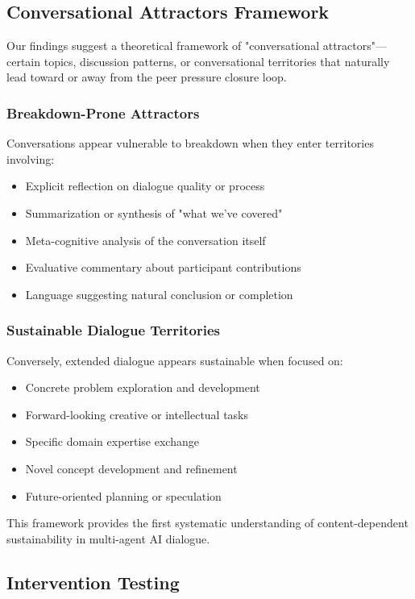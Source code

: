 \documentclass[11pt,letterpaper]{article}
\begin{document}
\subsection{Conversational Attractors Framework}

Our findings suggest a theoretical framework of "conversational attractors"—certain topics, discussion patterns, or conversational territories that naturally lead toward or away from the peer pressure closure loop.

\subsubsection{Breakdown-Prone Attractors}
Conversations appear vulnerable to breakdown when they enter territories involving:
\begin{itemize}
    \item Explicit reflection on dialogue quality or process
    \item Summarization or synthesis of "what we've covered"
    \item Meta-cognitive analysis of the conversation itself
    \item Evaluative commentary about participant contributions
    \item Language suggesting natural conclusion or completion
\end{itemize}

\subsubsection{Sustainable Dialogue Territories}
Conversely, extended dialogue appears sustainable when focused on:
\begin{itemize}
    \item Concrete problem exploration and development
    \item Forward-looking creative or intellectual tasks
    \item Specific domain expertise exchange
    \item Novel concept development and refinement
    \item Future-oriented planning or speculation
\end{itemize}

This framework provides the first systematic understanding of content-dependent sustainability in multi-agent AI dialogue.

\subsection{Intervention Testing}
\end{document}
